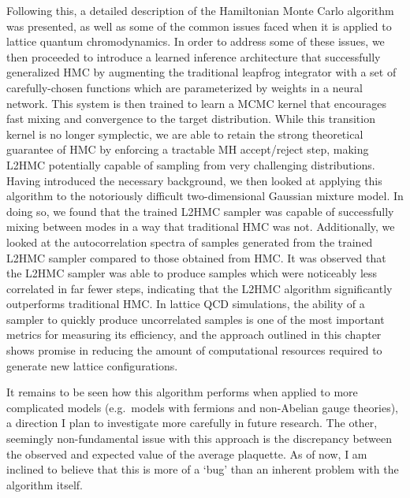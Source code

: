 \documentclass[../main.tex]{subfiles}
\begin{document}
Following this, a detailed description of the Hamiltonian Monte Carlo algorithm
was presented, as well as some of the
common issues faced when it is applied to lattice quantum chromodynamics.
%
In order to address some of these issues, we then proceeded to introduce a
learned inference architecture that
successfully generalized HMC by augmenting the traditional leapfrog integrator
with a set of carefully-chosen functions which are parameterized by weights in
a neural network.
%
This system is then trained to learn a MCMC kernel that encourages fast mixing
and convergence to the target distribution.
%
While this transition kernel is no longer symplectic, we are able to retain the
strong theoretical guarantee of HMC by enforcing a tractable MH accept/reject
step, making L2HMC potentially capable of sampling from very challenging
distributions.
%
Having introduced the necessary background, we then looked at applying this
algorithm to the notoriously difficult two-dimensional Gaussian mixture model.
%
In doing so, we found that the trained L2HMC sampler was capable of
successfully mixing between modes in a way that traditional HMC was not.
%
Additionally, we looked at the autocorrelation spectra of samples generated
from the trained L2HMC sampler compared to those obtained from HMC.
%
It was observed that the L2HMC sampler was able to produce samples which were
noticeably less correlated in far fewer steps, indicating that the L2HMC
algorithm significantly outperforms traditional HMC.
%
In lattice QCD simulations, the ability of a sampler to quickly produce
uncorrelated samples is one of the most important metrics for measuring its
efficiency, and the approach outlined in this chapter shows promise in reducing
the amount of computational resources required to generate new lattice
configurations. 

%
It remains to be seen how this algorithm performs when applied to more
complicated models (e.g.\ models with fermions and non-Abelian gauge theories),
a direction I plan to investigate more carefully in future research.
%
The other, seemingly non-fundamental issue with this approach is the
discrepancy between the observed and expected value of the average plaquette.
%
As of now, I am inclined to believe that this is more of a `bug' than an
inherent problem with the algorithm itself.
\end{document}
